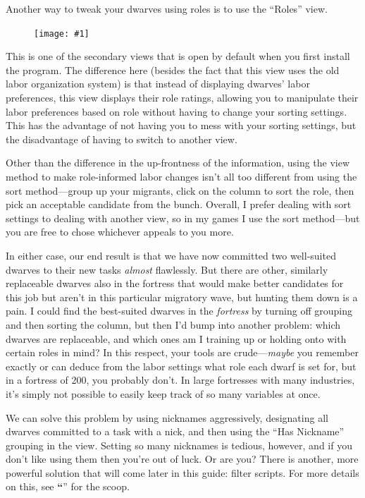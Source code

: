 \documentclass[]{article}
\newcommand{\jump}[1] {\textbf{``\nameref{sec:#1}}''}
\newcommand{\fullfigure}[1] {
\begin{figure}[h!]
\texttt{[image: \#1]}
\end{figure}
}
\begin{document}
Another way to tweak your dwarves using roles is to use the ``Roles'' view.

\fullfigure{Sec3Fig10+}

This is one of the secondary views that is open by default when you first install the program. The
difference here (besides the fact that this view uses the old labor organization system) is that instead
of displaying dwarves' labor preferences, this view displays their role ratings, allowing you to
manipulate their labor preferences based on role without having to change your sorting settings. This has
the advantage of not having you to mess with your sorting settings, but the disadvantage of having to
switch to another view.

Other than the difference in the up-frontness of the information, using the view method to make
role-informed labor changes isn't all too different from using the sort method---group up your
migrants, click on the column to sort the role, then pick an acceptable candidate from the bunch.
Overall, I prefer dealing with sort settings to dealing with another view, so in my games I use the sort
method---but you are free to chose whichever appeals to you more.

In either case, our end result is that we have now committed two well-suited dwarves to their new
tasks \emph{almost} flawlessly. But there are other, similarly replaceable dwarves also in the fortress
that would make better candidates for this job but aren't in this particular migratory wave, but hunting
them down is a pain. I could find the best-suited dwarves in the \emph{fortress} by turning off grouping
and then sorting the column, but then I'd bump into another problem: which dwarves are replaceable, and
which ones am I training up or holding onto with certain roles in mind? In this respect, your tools are
crude---\emph{maybe} you remember exactly or can deduce from the labor settings what role each dwarf is
set for, but in a fortress of 200, you probably don't. In large fortresses with many industries, it's
simply not possible to easily keep track of so many variables at once.

We can solve this problem by using nicknames aggressively, designating all dwarves committed to a task
with a nick, and then using the ``Has Nickname'' grouping in the view. Setting so many nicknames is
tedious, however, and if you don't like using them then you're out of luck. Or are you? There is another,
more powerful solution that will come later in this guide: filter scripts. For more details on this, see
\jump{Filter Scripts} for the scoop.
\end{document}
